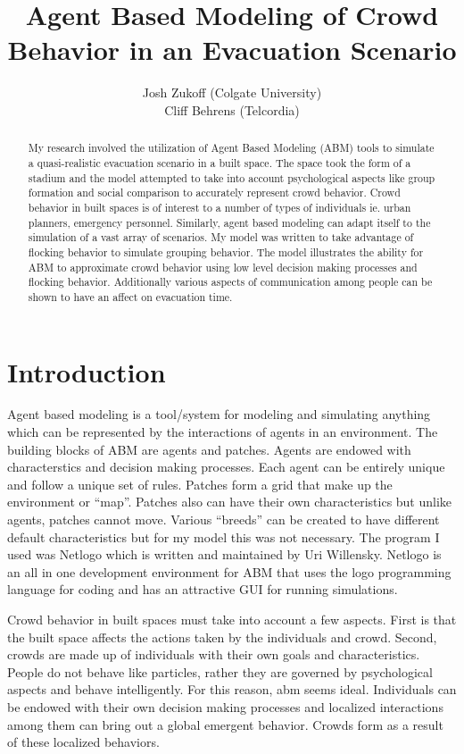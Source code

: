 \documentclass{article}
\title{Agent Based Modeling of Crowd Behavior in an Evacuation Scenario}
\author{
Josh Zukoff
(Colgate University)\\
Cliff Behrens
(Telcordia)
}
\begin{document}
\fancyheadoffset[LE,RO]{0pt}{\marginparsep + \marginparwidth}
\maketitle

\begin{abstract}
My research involved the utilization of Agent Based Modeling (ABM) tools to
simulate a quasi-realistic evacuation scenario in a built space. The
space took the form of a stadium and the model attempted to take into
account psychological aspects like group formation and social
comparison to accurately represent crowd behavior. Crowd behavior in
built spaces is of interest to a number of types of
individuals ie. urban planners, emergency personnel. Similarly, agent based modeling can adapt itself to the
simulation of a vast array of scenarios. My model was written to take
advantage of flocking behavior to simulate grouping behavior. The
model illustrates the ability for ABM to approximate crowd behavior
using low level decision making processes and flocking behavior. Additionally various
aspects of communication among people can be shown to have an affect
on evacuation time.

\end{abstract}

\section{Introduction}

Agent based modeling is a tool/system for modeling and simulating
anything which can be represented by the interactions of agents in an
environment. The building blocks of ABM are agents and patches. Agents
are endowed with characterstics and decision making processes. Each
agent can be entirely unique and follow a unique set of rules. Patches
form a grid that make up the environment or ``map''. Patches also can
have their own characteristics but unlike agents, patches cannot
move. Various ``breeds'' can be created to have different default
characteristics but for my model this was not necessary. The program I
used was Netlogo which is written and maintained by Uri
Willensky. Netlogo is an all in one development environment for ABM
that uses the logo programming language for coding and has an
attractive GUI for running simulations.

Crowd behavior in built spaces must take into account a few
aspects. First is that the built space affects the actions taken by
the individuals and crowd. Second, crowds are made up of individuals
with their own goals and characteristics. People do not behave like
particles, rather they are governed by psychological aspects and
behave intelligently. For this reason, abm seems ideal. Individuals
can be endowed with their own decision making processes and localized
interactions among them can bring out a global emergent
behavior. Crowds form as a result of these localized behaviors.
\end{document}
